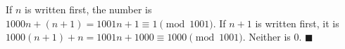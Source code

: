 If $n$ is written first, the number is $1000n+(n+1)=1001n+1\equiv1\pmod{1001}$. If $n+1$ is written first, it is $1000(n+1)+n=1001n+1000\equiv1000\pmod{1001}$. Neither is $0$. $\blacksquare$
